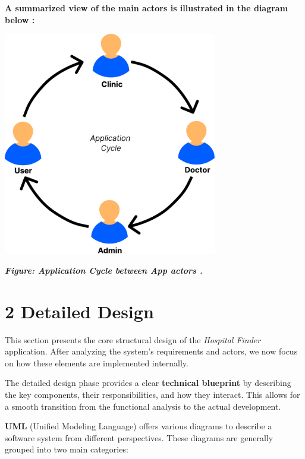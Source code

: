 \documentclass[12pt]{report}
\begin{document}
\noindent \textbf{A summarized view of the main actors is illustrated in the diagram below :}

\vspace*{0.6cm}
\begin{center}
	\includegraphics[width=0.7\textwidth]{images/AppCycle.pdf}
\end{center}
\vspace{0.1cm}
\begin{center}
	\textit{\textbf{Figure: Application Cycle between App actors .}}
\end{center}
\vspace{0.5cm}

\section*{2 Detailed Design}

This section presents the core structural design of the \textit{Hospital Finder} application. After analyzing the system’s requirements and actors, we now focus on how these elements are implemented internally.

\noindent The detailed design phase provides a clear \textbf{technical blueprint} by describing the key components, their responsibilities, and how they interact. This allows for a smooth transition from the functional analysis to the actual development.

\noindent \textbf{UML} (Unified Modeling Language) offers various diagrams to describe a software system from different perspectives. These diagrams are generally grouped into two main categories:
\end{document}

